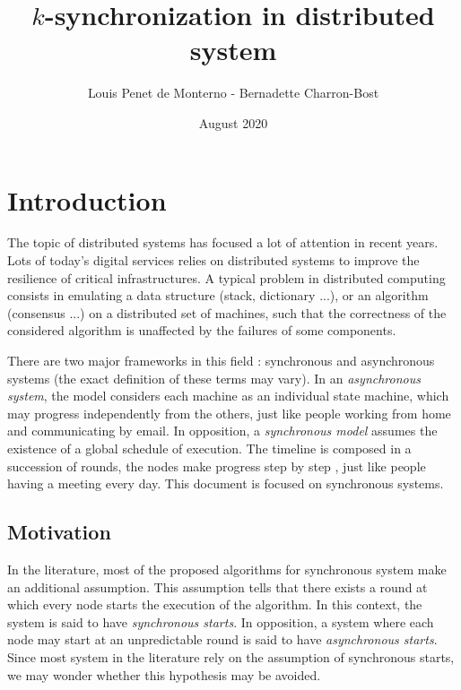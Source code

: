 \documentclass{article}
\title{$k$-synchronization in distributed system}
\date{August 2020}
\author{Louis Penet de Monterno - Bernadette Charron-Bost}
\begin{document}
\maketitle

\section{Introduction}

The topic of distributed systems has focused a lot of attention in recent years.
Lots of today's digital services relies on distributed systems to improve the resilience of critical infrastructures.
A typical problem in distributed computing consists in emulating a data structure (stack, dictionary ...), or an algorithm (consensus ...) on a distributed
set of machines, such that the correctness of the considered algorithm is unaffected by the failures of some components.

There are two major frameworks in this field : synchronous and asynchronous systems (the exact definition of these terms may vary).
In an \emph{asynchronous system}, the model considers each machine as an individual state machine, which may progress independently from the others,
just like people working from home and communicating by email.
In opposition, a \emph{synchronous model} assumes the existence of a global schedule of execution.
The timeline is composed in a succession of rounds, the nodes make progress step by step \cite{closed_communic},
just like people having a meeting every day.
This document is focused on synchronous systems.


\subsection{Motivation}

In the literature, most of the proposed algorithms for synchronous system make an additional assumption.
This assumption tells that there exists a round at which every node starts the execution of the algorithm.
In this context, the system is said to have \emph{synchronous starts}.
In opposition, a system where each node may start at an unpredictable round is said to have \emph{asynchronous starts}.
Since most system in the literature rely on the assumption of synchronous starts, we may wonder whether this hypothesis may be avoided.
\end{document}
